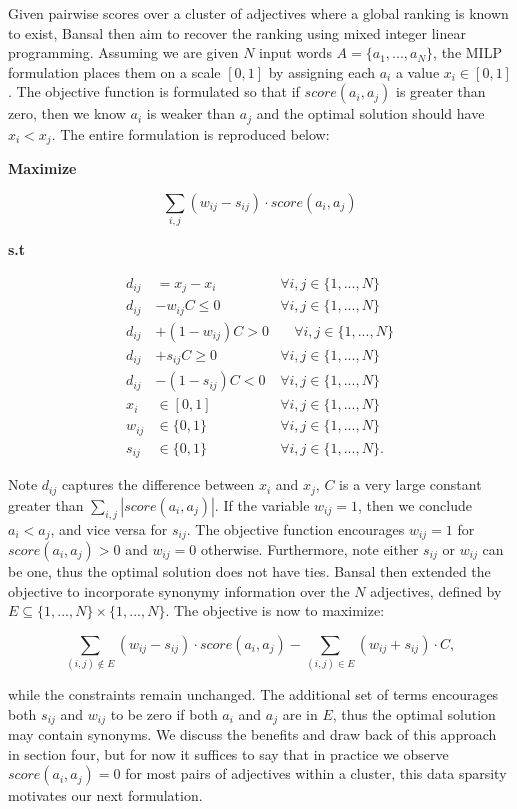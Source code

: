 Given pairwise scores over a cluster of adjectives where a global ranking is known to exist, Bansal then aim to recover the ranking using mixed integer linear programming. Assuming we are given $N$ input words $A = \{a_1, ..., a_N\}$, the MILP formulation places them on a scale $[0,1]$ by assigning each $a_i$ a value $x_i \in [0,1]$. The objective function is formulated so that if $score(a_i, a_j)$ is greater than zero, then we know $a_i$ is weaker than $a_j$ and the optimal solution should have $x_i < x_j$. The entire formulation is reproduced below:

{\bf Maximize}

\[ \sum_{i,j} (w_{ij} - s_{ij}) \cdot score(a_i, a_j)\]

{\bf s.t}

\begin{align*}
  d_{ij} &= x_j - x_i          &\forall i,j \in \{1,...,N\}\\
  d_{ij} &- w_{ij}C \leq 0     &\forall i,j \in \{1,...,N\}\\
  d_{ij} &+ (1 - w_{ij})C > 0  &\quad \forall i,j \in \{1,...,N\}\\
  d_{ij} &+ s_{ij}C \geq 0     &\forall i,j \in \{1,...,N\}\\
  d_{ij} &- (1 - s_{ij})C < 0  &\forall i,j \in \{1,...,N\}\\
  x_i    &\in [0,1]            &\forall i,j \in \{1,...,N\}\\
  w_{ij} &\in \{0,1\}          &\forall i,j \in \{1,...,N\}\\
  s_{ij} &\in \{0,1\}          &\forall i,j \in \{1,...,N\}.
\end{align*}


Note $d_{ij}$ captures the difference between $x_i$ and $x_j$, $C$ is a very large constant greater than $\sum_{i,j} |score(a_i,a_j)|$. If the variable $w_{ij} = 1$, then we conclude $a_i < a_j$, and vice versa for $s_{ij}$. The objective function encourages $w_{ij} = 1$  for $score(a_i,a_j) > 0$ and $w_{ij} = 0$ otherwise. Furthermore, note either $s_{ij}$ or $w_{ij}$ can be one, thus the optimal solution does not have ties. Bansal then extended the objective to incorporate synonymy information over the $N$ adjectives, defined by $E \subseteq \{1,...,N\} \times \{1,...,N\}$. The objective is now to maximize:

\[ \sum_{(i,j) \not\in E} (w_{ij} - s_{ij}) \cdot score(a_i, a_j) - \sum_{(i,j) \in E} (w_{ij} + s_{ij}) \cdot C,\]

while the constraints remain unchanged. The additional set of terms encourages both $s_{ij}$ and $w_{ij}$ to be zero if both $a_i$ and $a_j$ are in $E$, thus the optimal solution may contain synonyms. We discuss the benefits and draw back of this approach in section four, but for now it suffices to say that in practice we observe $score(a_i, a_j) = 0$ for most pairs of adjectives within a cluster, this data sparsity motivates our next formulation.
